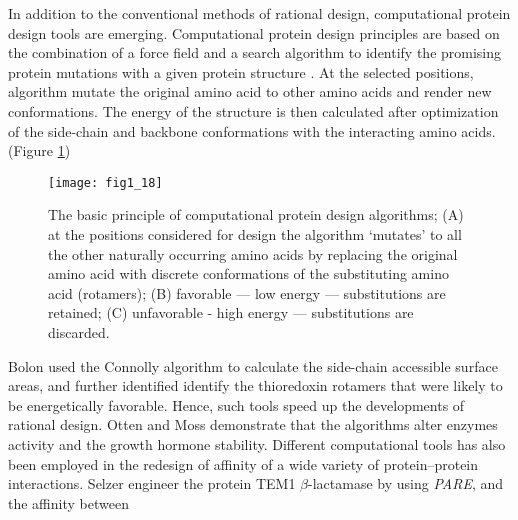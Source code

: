 \begin{refsection}
In addition to the conventional methods of rational design, computational
protein design tools are emerging. Computational protein design principles
are based on the combination of a force field and a search algorithm to
identify the promising protein mutations with a given protein structure
\cite{VanDerSloot2009a}. At the selected positions, algorithm mutate the
original amino acid to other amino acids and render new conformations. The
energy of the structure is then calculated after optimization of the side-chain
and backbone conformations with the interacting amino
acids\cite{VanDerSloot2009a}. (Figure \ref{fig:cpd})
\begin{figure}[h!] \centering \texttt{[image: fig1\_18]}
    \caption[The basic principle of computational protein design algorithms;
        (A) at the positions considered for design the algorithm ‘mutates’ to
        all the other naturally occurring amino acids by replacing the original
        amino acid with discrete conformations of the substituting amino acid
        (rotamers); (B) favorable — low energy — substitutions are retained;
        (C) unfavorable - high energy — substitutions are discarded.]{The basic
            principle of computational protein design algorithms; (A) at the
            positions considered for design the algorithm ‘mutates’ to all the
            other naturally occurring amino acids by replacing the original
            amino acid with discrete conformations of the substituting amino
            acid (rotamers); (B) favorable — low energy — substitutions are
            retained; (C) unfavorable - high energy — substitutions are
            discarded\cite{VanDerSloot2009a}.} 
    \label{fig:cpd} 
\end{figure}
Bolon  used the Connolly algorithm\cite{Connolly1983} to
calculate the side-chain accessible surface areas, and further identified
identify the thioredoxin rotamers that were likely to be energetically
favorable\cite{Bolon2003}. Hence, such tools speed up the developments of
rational design. Otten  and Moss  demonstrate that
the algorithms alter enzymes activity \cite{Otten2010} and the growth hormone
stability\cite{Moss2009}. Different computational tools has also been
employed in the redesign of affinity of a wide variety of protein–protein
interactions\cite{Selzer2000,Reina2002}. Selzer  engineer the
protein TEM1 $\beta$-lactamase by using \emph{PARE}, and the affinity between

\end{refsection}
